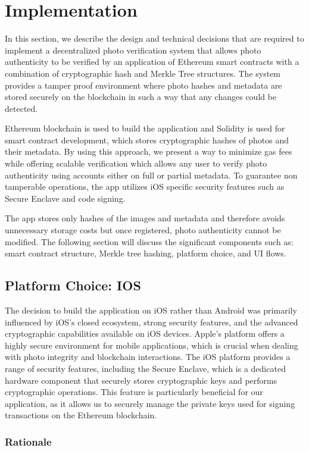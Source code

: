 \chapter{Implementation}

In this section, we describe the design and technical decisions that are required to implement a decentralized photo verification system that allows photo authenticity to be verified by an application of Ethereum smart contracts with a combination of cryptographic hash and Merkle Tree structures. The system provides a tamper proof environment where photo hashes and metadata are stored securely on the blockchain in such a way that any changes could be detected.

Ethereum blockchain is used to build the application and Solidity is used for smart contract development, which stores cryptographic hashes of photos and their metadata. By using this approach, we present a way to minimize gas fees while offering scalable verification which allows any user to verify photo authenticity using accounts either on full or partial metadata. To guarantee non tamperable operations, the app utilizes iOS specific security features such as Secure Enclave and code signing.

The app stores only hashes of the images and metadata and therefore avoids unnecessary storage costs but once registered, photo authenticity cannot be modified. The following section will discuss the significant components such as: smart contract structure, Merkle tree hashing, platform choice, and UI flows.
\break
\section{Platform Choice: IOS}
The decision to build the application on iOS rather than Android was primarily influenced by iOS's closed ecosystem, strong security features, and the advanced cryptographic capabilities available on iOS devices. Apple’s platform offers a highly secure environment for mobile applications, which is crucial when dealing with photo integrity and blockchain interactions.
The iOS platform provides a range of security features, including the Secure Enclave, which is a dedicated hardware component that securely stores cryptographic keys and performs cryptographic operations. This feature is particularly beneficial for our application, as it allows us to securely manage the private keys used for signing transactions on the Ethereum blockchain.

\subsection{Rationale}

